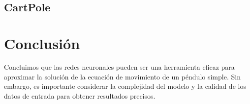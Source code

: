 \documentclass[a4paper,12pt]{article}
\begin{document}
\subsection{CartPole}


\section{Conclusión}
Concluimos que las redes neuronales pueden ser una herramienta eficaz para aproximar la solución de la ecuación de movimiento de un péndulo simple. Sin embargo, es importante considerar la complejidad del modelo y la calidad de los datos de entrada para obtener resultados precisos.
\end{document}
